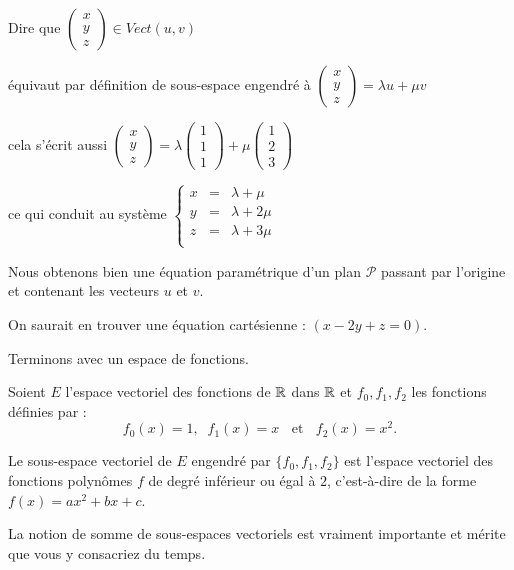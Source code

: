 \change

Dire que $ \left(\begin{smallmatrix}x \\ y \\ z \end{smallmatrix}\right) \in Vect (u,v)$

\change

 équivaut par définition de sous-espace engendré à 
$\left(\begin{smallmatrix}x \\ y \\ z \end{smallmatrix}\right) = \lambda u + \mu v$ 

\change

cela s'écrit aussi 
$ \left(\begin{smallmatrix}x \\ y \\ z \end{smallmatrix}\right) = 
 \lambda\left(\begin{smallmatrix}1 \\ 1 \\ 1 \end{smallmatrix}\right) + \mu \left(\begin{smallmatrix}1 \\ 2 \\ 3 \end{smallmatrix}\right)
$

\change

ce qui conduit au système 
$
 \left\{
 \begin{array}{rcl}
   x & = & \lambda + \mu \\
   y & = & \lambda + 2 \mu \\
   z & = & \lambda + 3 \mu \\
 \end{array}\right. $
 
 
Nous obtenons bien une équation paramétrique d'un plan $\mathcal{P}$
passant par l'origine et contenant les vecteurs $u$ et $v$.

\change

On saurait en trouver une équation cartésienne : $(x-2y+z=0)$.

\change

Terminons avec un espace de fonctions.

Soient $E$ l'espace vectoriel des fonctions de $\mathbb{R}$ dans $\mathbb{R}$ et  
$f_0, f_1, f_2$ les fonctions définies par :
$$f_0(x)=1, \;\; f_1(x)=x\;\;\text{ et } \;\; f_2(x)=x^2.$$

\change

Le sous-espace vectoriel de $E$ engendré par $\{f_0, f_1, f_2\}$ 
est l'espace vectoriel des fonctions polynômes $f$ de degré inférieur 
ou égal à $2$, c'est-à-dire de la forme $f(x) = ax^2+bx+c$.


\diapo

La notion de somme de sous-espaces vectoriels est vraiment importante
et mérite que vous y consacriez du temps.



